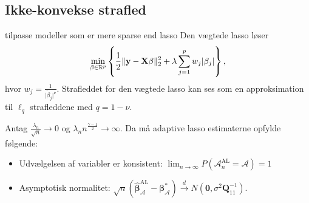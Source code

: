 \subsection{Ikke-konvekse strafled}

tilpasse modeller som er mere sparse end lasso
Den vægtede lasso løser
\begin{align*}
\min_{\beta \in \R^p} \cbr{\frac{1}{2} \Vert \y - \X \beta \Vert_2^2 + \lambda \sum_{j=1}^p w_j \vert \beta_j \vert},
\end{align*}
hvor $w_j = \frac{1}{\vert \tilde{\beta}_j \vert^\nu}$.
Strafleddet for den vægtede lasso kan ses som en approksimation til $\ell_q$ strafleddene med $q=1-\nu$.

\citep{adaptive}
\begin{thm}\label{thm:ALoracle}
Antag $\frac{\lambda_n}{\sqrt{n}} \rightarrow 0$ og $\lambda_n n^\frac{\gamma-1}{2} \rightarrow \infty$. Da må adaptive lasso estimaterne opfylde følgende:
\begin{itemize}
\item Udvælgelsen af variabler er konsistent: $\lim_{n \rightarrow \infty} P(\mathcal{A}_n^\text{AL}=\mathcal{A})=1$
\item Asymptotisk normalitet: $\sqrt{n}\left( \hat{\boldsymbol{\beta}}_\mathcal{A}^{\text{AL}}-\boldsymbol{\beta}_\mathcal{A}^* \right) \overset{d}{\rightarrow} N(\textbf{0},\sigma^2 \boldsymbol{Q}_{11}^{-1}).$
\end{itemize} 
\end{thm}

